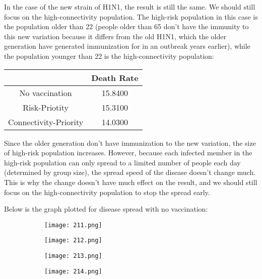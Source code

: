 \documentclass[titlepage]{article}
\begin{document}
In the case of the new strain of H1N1, the result is still the same. We should still focus on the high-connectivity population. The high-risk population in this case is the population older than 22 (people older than 65 don't have the immunity to this new variation because it differs from the old H1N1, which the older generation have generated immunization for in an outbreak years earlier), while the population younger than 22 is the high-connectivity population:

\begin{center}
\begin{tabular}{ | c | c | }
\hline
 & Death Rate\\\hline
No vaccination & 15.8400\\\hline
Risk-Priotity & 15.3100\\\hline
Connectivity-Priority & 14.0300\\
\hline
\end{tabular}
\end{center}

Since the older generation don't have immunization to the new variation, the size of high-risk population increases. However, because each infected member in the high-risk population can only spread to a limited number of people each day (determined by group size), the spread speed of the disease doesn't change much. This is why the change doesn't have much effect on the result, and we should still focus on the high-connectivity population to stop the spread early.

Below is the graph plotted for disease spread with no vaccination:

\begin{figure}[H]
       \centering
       \begin{subfigure}{0.48\textwidth}
       \centering
       \texttt{[image: 211.png]}
       \end{subfigure}\quad
       \begin{subfigure}{0.48\textwidth}
       \centering
       \texttt{[image: 212.png]}
       \end{subfigure}
              \begin{subfigure}{0.48\textwidth}
       \centering
       \texttt{[image: 213.png]}
       \end{subfigure}\quad
       \begin{subfigure}{0.48\textwidth}
       \centering
       \texttt{[image: 214.png]}
       \end{subfigure}
\end{figure}
\end{document}
